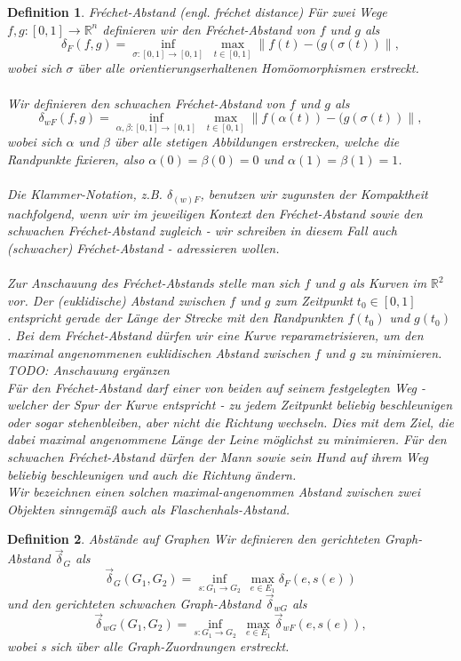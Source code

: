 \documentclass[a4paper, 12pt, twoside]{article}
\theoremstyle{Format1} %
\newtheorem{Def}{Definition}[section]       %
\begin{document}
\begin{Def} \label{Definition Fréchet-Abstand}
	Fréchet-Abstand (engl. fréchet distance)
	Für zwei Wege $ f, g: [0,1] \to \mathbb{R}^n $ definieren wir den \textit{Fréchet-Abstand} von $f$ und $g$ als
	$$ \delta_F(f,g) =  \inf_{\sigma:[0,1] \to [0,1]} \; \max_{t \in [0,1]} \lVert f(t)-(g(\sigma(t)) \rVert, $$
	wobei sich $\sigma $ über alle orientierungserhaltenen Homöomorphismen erstreckt.
	\\
	\\
	Wir definieren den \textit{schwachen Fréchet-Abstand} von $f$ und $g$ als
	$$\delta_{wF}(f,g) =\inf_{\alpha , \beta :[0,1] \to [0,1]} \; \max_{t \in [0,1]} \lVert f(\alpha(t))-(g(\sigma(t)) \rVert,$$
	wobei sich $\alpha$ und $\beta$ über alle stetigen Abbildungen erstrecken, welche die Randpunkte fixieren, also $\alpha(0) = \beta(0) = 0$
	und $\alpha(1) = \beta(1) = 1$.
	\\
	\\
	Die Klammer-Notation, z.B. $ \delta_{(w)F} $, benutzen wir zugunsten der Kompaktheit nachfolgend, wenn wir im jeweiligen Kontext den Fréchet-Abstand sowie den schwachen Fréchet-Abstand zugleich -
	wir schreiben in diesem Fall auch \textit{(schwacher) Fréchet-Abstand} - adressieren wollen.
	\\
	\\
	Zur Anschauung des Fréchet-Abstands stelle man sich $f$ und $g$ als Kurven im $\mathbb{R}^2$ vor. Der (euklidische) Abstand zwischen $f$ und $g$ zum Zeitpunkt $t_0 \in [0,1]$ entspricht gerade der Länge der Strecke
	mit den Randpunkten $f(t_0)$ und $g(t_0)$. Bei dem Fréchet-Abstand dürfen wir eine Kurve reparametrisieren, um den maximal angenommenen euklidischen Abstand zwischen $f$ und $g$ zu minimieren.
	TODO: Anschauung ergänzen
	\\
	Für den Fréchet-Abstand darf einer von beiden auf seinem festgelegten Weg - welcher der Spur der Kurve entspricht - zu jedem Zeitpunkt beliebig beschleunigen oder sogar stehenbleiben, aber nicht die Richtung wechseln.
	Dies mit dem Ziel, die dabei maximal angenommene Länge der Leine möglichst zu minimieren.
	Für den schwachen Fréchet-Abstand dürfen der Mann sowie sein Hund auf ihrem Weg beliebig beschleunigen und auch die Richtung ändern.
	\\
	Wir bezeichnen einen solchen maximal-angenommen Abstand zwischen zwei Objekten sinngemäß auch als \textit{Flaschenhals-Abstand}.
	\\
\end{Def}

\begin{Def} \label{Definition Graph-Abstand}
	Abstände auf Graphen
	Wir definieren den \textit{gerichteten Graph-Abstand} $ \vec{\delta}_G $ als
	$$ \vec{\delta}_G(G_1,G_2) = \inf_{s: G_1 \to G_2} \: \max_{e \in E_1} \delta_F(e, s(e)) $$
	und den \textit{gerichteten schwachen Graph-Abstand} $ \vec{\delta}_{wG} $ als
	$$  \vec{\delta}_{wG}(G_1,G_2) = \inf_{s: G_1 \to G_2} \: \max_{e \in E_1} \vec{\delta}_{wF}(e, s(e)), $$
	wobei s sich über alle Graph-Zuordnungen erstreckt.
\end{Def}
\end{document}
